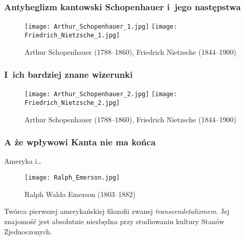 \documentclass{beamer}  %
\begin{document}
\begin{frame}
  \frametitle{Antyheglizm kantowski Schopenhauer i~jego następstwa}

  \begin{block}{}
    \begin{figure}
      \centering

      \texttt{[image: Arthur\_Schopenhauer\_1.jpg]}
      \texttt{[image: Friedrich\_Nietzsche\_1.jpg]} \pause
      \caption{Arthur Schopenhauer (1788--1860), Friedrich Nietzsche
        (1844--1900)}
    \end{figure}
  \end{block}

\end{frame}



\begin{frame}
  \frametitle{I~ich bardziej znane wizerunki}

  \begin{block}{}
    \begin{figure}
      \centering

      \texttt{[image: Arthur\_Schopenhauer\_2.jpg]}
      \texttt{[image: Friedrich\_Nietzsche\_2.jpg]}
      \caption{Arthur Schopenhauer (1788--1860), Friedrich Nietzsche
        (1844--1900)}
    \end{figure}
  \end{block}

\end{frame}



\begin{frame}
  \frametitle{A że wpływowi Kanta nie ma końca}

  \begin{block}{Ameryka i\ldots}
    \begin{figure}
      \centering

      \texttt{[image: Ralph\_Emerson.jpg]}
      \caption{Ralph Waldo Emerson (1803--1882)}
    \end{figure}
  \end{block}

  \begin{block}{}
    Twórca pierwszej amerykańskiej filozofii zwanej
    \emph{transcendetalizmem}. Jej znajomość jest absolutnie niezbędna
    przy studiowaniu kultury Stanów Zjednoczonych.
  \end{block}

\end{frame}
\end{document}
